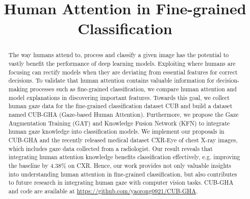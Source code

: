 \documentclass{bmvc2k}
\title{Human Attention in Fine-grained Classification}
\begin{document}
\maketitle

\begin{abstract}
The way humans attend to, process and classify a given image has the potential to vastly benefit the performance of deep learning models. Exploiting where humans are focusing can rectify models when they are deviating from essential features for correct decisions. To validate that human attention contains valuable information for decision-making processes such as fine-grained classification, we compare human attention and model explanations in discovering important features. Towards this goal, we collect human gaze data for the fine-grained classification dataset CUB and build a dataset named CUB-GHA (Gaze-based Human Attention). Furthermore, we propose the Gaze Augmentation Training (GAT) and Knowledge Fusion Network (KFN) to integrate human gaze knowledge into classification models. We implement our proposals in CUB-GHA and the recently released medical dataset CXR-Eye of chest X-ray images, which includes gaze data collected from a radiologist. Our result reveals that integrating human attention knowledge benefits classification effectively, e.g. improving the baseline by 4.38\% on CXR. Hence, our work provides not only valuable insights into understanding human attention in fine-grained classification, but also contributes to future research in integrating human gaze with computer vision tasks. CUB-GHA and code are available at \url{https://github.com/yaorong0921/CUB-GHA}.
\end{abstract}
\end{document}
